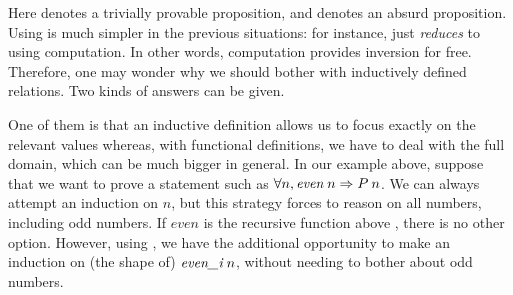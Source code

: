 \medskip
{}
\medskip

\noindent
Here  denotes a trivially provable proposition,
and  denotes an absurd proposition.
%
Using  is much simpler in the previous situations:
for instance,  just \emph{reduces} to
 using computation.
In other words, computation provides inversion for free.
Therefore, one may wonder why we should bother with inductively defined
relations.
Two kinds of answers can be given.

One of them is that an inductive definition allows us 
to focus exactly on the relevant values
whereas, with functional definitions,
we have to deal with the full domain,
which can be much bigger in general.
In our example above,
suppose that we want to prove a statement such as
$\forall n, \mathit{even}\:n \Rightarrow P\: n$.
We can always attempt an induction on $n$,
but this strategy forces to reason on all numbers, 
including odd numbers.
If $\mathit{even}$ is the recursive function above ,
there is no other option.
However, using , 
we have the additional opportunity to make an induction on 
(the shape of) $\textit{even\_i}\;n$,
without needing to bother about odd numbers.


